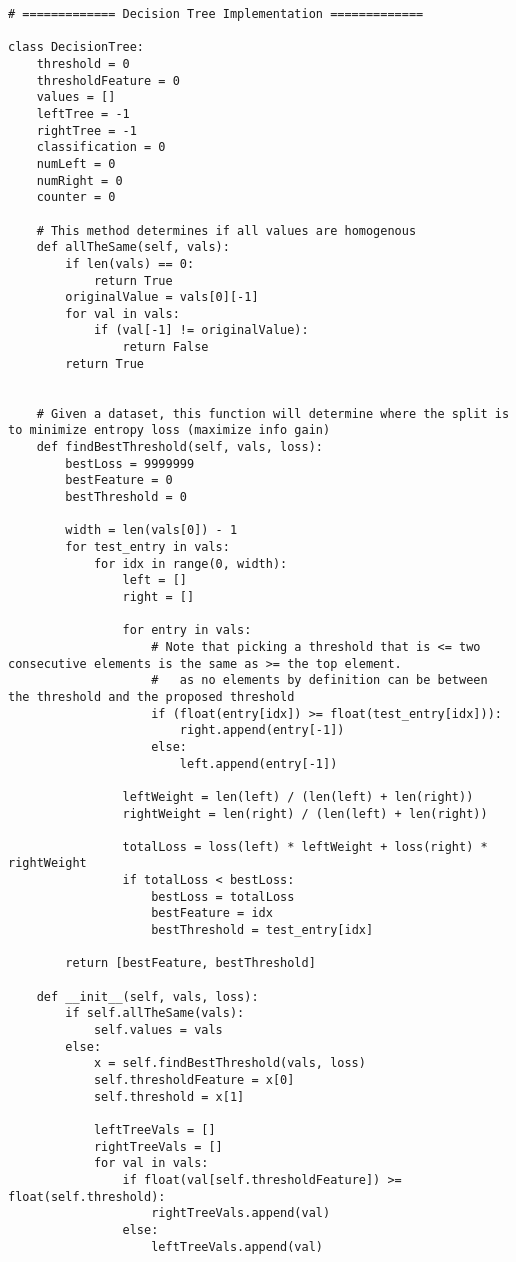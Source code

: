 \documentclass{article}
\begin{document}
\begin{titlepage}
\begin{lstlisting}
# ============= Decision Tree Implementation =============

class DecisionTree:
    threshold = 0
    thresholdFeature = 0
    values = []
    leftTree = -1
    rightTree = -1
    classification = 0
    numLeft = 0
    numRight = 0
    counter = 0

    # This method determines if all values are homogenous
    def allTheSame(self, vals):
        if len(vals) == 0:
            return True
        originalValue = vals[0][-1]
        for val in vals:
            if (val[-1] != originalValue):
                return False
        return True


    # Given a dataset, this function will determine where the split is to minimize entropy loss (maximize info gain)
    def findBestThreshold(self, vals, loss):
        bestLoss = 9999999
        bestFeature = 0
        bestThreshold = 0

        width = len(vals[0]) - 1
        for test_entry in vals:
            for idx in range(0, width):
                left = []
                right = []

                for entry in vals:
                    # Note that picking a threshold that is <= two consecutive elements is the same as >= the top element.
                    #   as no elements by definition can be between the threshold and the proposed threshold
                    if (float(entry[idx]) >= float(test_entry[idx])):
                        right.append(entry[-1])
                    else:
                        left.append(entry[-1])

                leftWeight = len(left) / (len(left) + len(right))
                rightWeight = len(right) / (len(left) + len(right))

                totalLoss = loss(left) * leftWeight + loss(right) * rightWeight
                if totalLoss < bestLoss:
                    bestLoss = totalLoss
                    bestFeature = idx
                    bestThreshold = test_entry[idx]

        return [bestFeature, bestThreshold]

    def __init__(self, vals, loss):
        if self.allTheSame(vals):
            self.values = vals
        else:
            x = self.findBestThreshold(vals, loss)
            self.thresholdFeature = x[0]
            self.threshold = x[1]

            leftTreeVals = []
            rightTreeVals = []
            for val in vals:
                if float(val[self.thresholdFeature]) >= float(self.threshold):
                    rightTreeVals.append(val)
                else:
                    leftTreeVals.append(val)


\end{lstlisting}
\end{titlepage}
\end{document}
